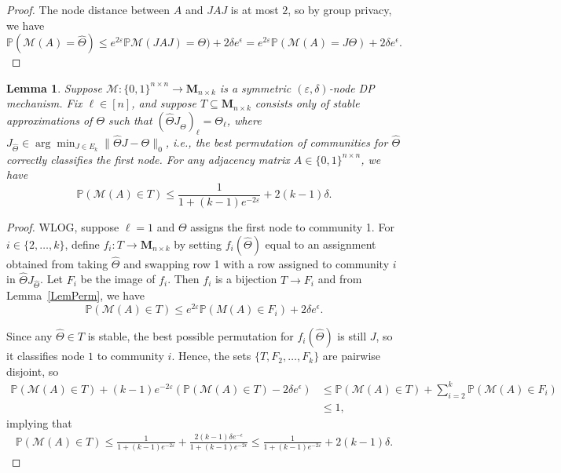 \documentclass{article}
\newtheorem{lemma}{Lemma}
\newcommand{\eps}{\varepsilon}
\newcommand{\calM}{\mathcal{M}}
\begin{document}
\begin{proof}
The node distance between $A$ and $JAJ$ is at most $2$, so by group privacy, we have
$$\mathbb{P}(\calM(A)=\hat\Theta)\leq e^{2\eps} \mathbb{P}\calM(JAJ)=\Theta) + 2\delta e^{\epsilon} = e^{2\eps} \mathbb{P}(\calM(A)=J\Theta) + 2\delta e^{\epsilon}.$$
\end{proof}

\begin{lemma}
\label{LemStableBound}
Suppose $\calM: \{0,1\}^{n\times n}\to \mathbf{M}_{n\times k}$ is a symmetric $(\eps, \delta)$-node DP mechanism. Fix $\ell \in [n]$, and suppose $T\subseteq \mathbf{M}_{n\times k}$ consists only of stable approximations of $\Theta$ such that $(\hat\Theta J_{\hat \Theta})_{\ell} = \Theta_\ell$, where $J_{\hat\Theta} \in \arg\min_{J \in E_k} \|\hat\Theta J - \Theta\|_0$, i.e., the best permutation of communities for $\hat\Theta$ correctly classifies the first node. For any adjacency matrix $A\in \{0,1\}^{n\times n}$, we have
$$\mathbb{P}(\calM(A)\in T) \leq \frac{1}{1+(k-1)e^{-2\eps}} + 2(k - 1)\delta.
$$
\end{lemma}

\begin{proof}
WLOG, suppose $\ell = 1$ and $\Theta$ assigns the first node to community 1. For $i\in \{2, \ldots, k\}$, define $f_i:T\to \mathbf{M}_{n\times k}$ by setting $f_i(\hat\Theta)$ equal to an assignment obtained from taking $\hat\Theta$ and swapping row 1 with a row assigned to community $i$ in $\hat\Theta J_{\hat\Theta}$. Let $F_i$ be the image of $f_i$. Then $f_i$ is a bijection $T\to F_i$ and from Lemma~\ref{LemPerm}, we have
\begin{equation*}
\mathbb{P}(\calM(A)\in T)\leq e^{2\eps} \mathbb{P}(M(A)\in F_i) + 2\delta e^{\epsilon}.
\end{equation*}

Since any $\hat\Theta\in T$ is stable, the best possible permutation for $f_i(\hat\Theta)$ is still $J$, so it classifies node $1$ to community $i$. Hence, the sets $\{T, F_2, \dots, F_k\}$ are pairwise disjoint, so
\begin{align*}
\mathbb{P}(\calM(A)\in T) + (k-1)e^{-2\eps} \left(\mathbb{P}(\calM(A)\in T) - 2\delta e^{\epsilon}\right) & \le \mathbb{P}(\calM(A)\in T) + \sum_{i=2}^k \mathbb{P}(\calM(A)\in F_i) \\
%
& \leq 1,
\end{align*}
implying that
\begin{align*}
\mathbb{P}(\calM(A)\in T) \leq \frac{1}{1+(k-1)e^{-2\eps}} + \frac{2(k - 1)\delta e^{-\epsilon}}{1 + (k - 1)e^{-2\epsilon}} \leq \frac{1}{1+(k-1)e^{-2\eps}} + 2(k - 1)\delta.
\end{align*}
\end{proof}
\end{document}
